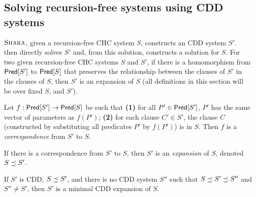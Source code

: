 \subsection{Solving recursion-free systems using CDD systems}
\label{sec:core-solver}

$\textsc{Shara}$, given a recursion-free CHC system $S$,
constructs an CDD system $S'$.
%
\sys then directly solves $S'$ and, from this solution, constructs a solution
for $S$.
For two given recursion-free CHC systems $S$ and $S'$, if
there is a homomorphism from $\mathsf{Pred}[ S' ]$ to $\mathsf{Pred}[ S ]$ that
preserves the relationship between the clauses of $S'$ in
the clauses of $S$, then $S'$ is an expansion of
$S$ (all definitions in this section will be over fixed
$S$, and $S'$).
\begin{defn}
  \label{defn:expansion}
  Let $f : \mathsf{Pred}[ S' ] \to \mathsf{Pred}[ S ]$ be such that
  \textbf{(1)} for all $P' \in \mathsf{Pred}[ S' ]$, $P'$ has the
  same vector of parameters as $f(P')$;
  \textbf{(2)} for each clause $C' \in S'$, the clause $C$ (constructed
  by substituting all predicates $P'$ by $f(P')$) is in $S$.
  Then $f$ is a \emph{correspondence} from $S'$ to $S$.
\end{defn}
%
If there is a correspondence from $S'$ to $S$, then $S'$ is an \emph{expansion}
of $S$, denoted $S \preceq S'$.
%

%
\begin{defn}
  If $S'$ is CDD, $S \preceq S'$, and there is no CDD system $S''$ such that $S \preceq S' \preceq S''$ and
  $S'' \neq S'$, then $S'$ is a minimal CDD expansion of $S$.
\end{defn}

